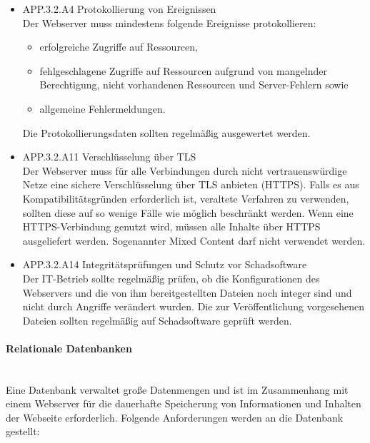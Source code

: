 \begin{itemize}
      \item APP.3.2.A4 Protokollierung von Ereignissen\\
			Der Webserver muss mindestens folgende Ereignisse protokollieren:
\begin{itemize}
\item erfolgreiche Zugriffe auf Ressourcen,
\item fehlgeschlagene Zugriffe auf Ressourcen aufgrund von mangelnder Berechtigung, nicht vorhandenen Ressourcen und Server-Fehlern sowie
\item allgemeine Fehlermeldungen.
\end{itemize}
Die Protokollierungsdaten sollten regelm\"a{\ss}ig ausgewertet werden.\cite{Grundschutz}\\
			
			\item APP.3.2.A11 Verschl\"usselung \"uber TLS\\
			Der Webserver muss f\"ur alle Verbindungen durch nicht vertrauensw\"urdige Netze eine sichere Verschl\"usselung \"uber \ac{TLS} anbieten (HTTPS). Falls es aus Kompatibilit\"atsgr\"unden erforderlich ist, veraltete Verfahren zu verwenden, sollten diese auf so wenige F\"alle wie m\"oglich beschr\"ankt werden. Wenn eine HTTPS-Verbindung genutzt wird, m\"ussen alle Inhalte \"uber HTTPS ausgeliefert werden. Sogenannter Mixed Content darf nicht verwendet werden.\cite{Grundschutz}\\
			
			\item APP.3.2.A14 Integrit\"atspr\"ufungen und Schutz vor Schadsoftware\\
			Der IT-Betrieb sollte regelm\"a{\ss}ig pr\"ufen, ob die Konfigurationen des Webservers und die von ihm bereitgestellten Dateien noch integer sind und nicht durch Angriffe ver\"andert wurden. Die zur Ver\"offentlichung vorgesehenen Dateien sollten regelm\"a{\ss}ig auf Schadsoftware gepr\"uft werden.\cite{Grundschutz}\\
						
   \end{itemize}  

\paragraph{Relationale Datenbanken}
\noindent \\Eine Datenbank verwaltet gro{\ss}e Datenmengen und ist im Zusammenhang mit einem Webserver f\"ur die dauerhafte Speicherung von Informationen und Inhalten der Webseite erforderlich. Folgende Anforderungen werden an die Datenbank gestellt:

